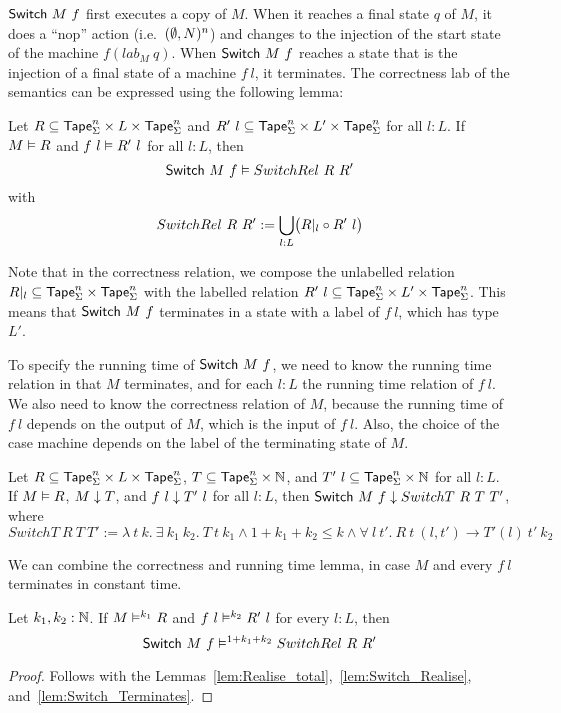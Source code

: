 $\mathsf{Switch}~M~f$ first executes a copy of $M$.  When it reaches a final state $q$ of $M$, it does a ``nop'' action (i.e.\ $(\emptyset,N)^n$) and changes
to the injection of the start state of the machine $f(lab_M~q)$.  When $\mathsf{Switch}~M~f$ reaches a state that is the injection of a final state of a
machine $f~l$, it terminates.  The correctness lab of the semantics can be expressed using the following lemma:

\begin{lemma}
  \label{lem:Switch_Realise}
  Let $R \subseteq \mathsf{Tape}_\Sigma^n \times L \times \mathsf{Tape}_\Sigma^n$ and $R'~l \subseteq \mathsf{Tape}_\Sigma^n \times L' \times \mathsf{Tape}_\Sigma^n$ for all $l:L$.
  If $M \mathrel{\vDash} R$ and $f~l \mathrel{\vDash} R'~l$ for all $l:L$, then
  \[
    \mathsf{Switch}~M~f \mathrel{\vDash} SwitchRel~R~R'
  \]
  with
  \[
    SwitchRel~R~R' := \bigcup_{l:L} \bigl( R{|}_{l} \circ R'~l \bigr)
  \]
\end{lemma}

Note that in the correctness relation, we compose the unlabelled relation $R {|}_{l} \subseteq \mathsf{Tape}_\Sigma^n \times \mathsf{Tape}_\Sigma^n$ with the labelled
relation $R'~l \subseteq \mathsf{Tape}_\Sigma^n \times L' \times \mathsf{Tape}_\Sigma^n$.  This means that $\mathsf{Switch}~M~f$ terminates in a state with a label of $f~l$,
which has type $L'$.

To specify the running time of $\mathsf{Switch}~M~f$, we need to know the running time relation in that $M$ terminates, and for each $l:L$ the running
time relation of $f~l$.  We also need to know the correctness relation of $M$, because the running time of $f~l$ depends on the output of $M$, which
is the input of $f~l$.  Also, the choice of the case machine depends on the label of the terminating state of $M$.

\begin{lemma}
  \label{lem:Switch_Terminates}
  Let $R \subseteq \mathsf{Tape}_\Sigma^n \times L \times \mathsf{Tape}_\Sigma^n$, $T \subseteq \mathsf{Tape}_\Sigma^n \times \mathbb{N}$, and
  $T'~l \subseteq \mathsf{Tape}_\Sigma^n \times \mathbb{N}$ for all $l:L$.  If $M \mathrel{\vDash} R$, $M \mathrel{\downarrow} T$, and $f~l \mathrel{\downarrow} T'~l$ for all $l:L$, then
  $\mathsf{Switch}~M~f \mathrel{\downarrow} SwitchT~R~T~T'$, where
  \[
    SwitchT~R~T~T' :=
    \lambda~t~k.~ \exists~k_1~k_2.~T~t~k_1 \land 1+k_1+k_2 \le k \land
      \forall~l~t'.~ R~t~(l,t') \rightarrow T'(l)~t'~k_2
  \]
\end{lemma}

We can combine the correctness and running time lemma, in case $M$ and every $f~l$ terminates in constant time.
\begin{lemma}
  \label{lem:Switch_RealiseIn}
  Let $k_1, k_2:\mathbb{N}$.
  If $M \mathrel{\vDash^{k_1}} R$ and $f~l \mathrel{\vDash^{k_2}} R'~l$ for every $l:L$, then
  \[ \mathsf{Switch}~M~f \mathrel{\vDash^{1+k_1+k_2}} SwitchRel~R~R' \]
\end{lemma}
\begin{proof}
  Follows with the Lemmas~\ref{lem:Realise_total},~\ref{lem:Switch_Realise}, and~\ref{lem:Switch_Terminates}.
\end{proof}


